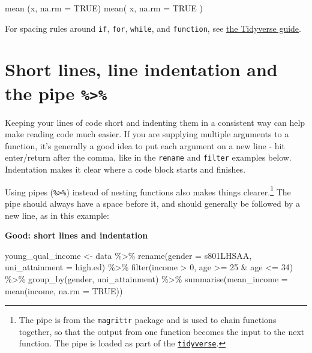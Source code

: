 \documentclass[
]{book}
\newenvironment{Shaded}{\begin{snugshade}}{\end{snugshade}}
\newcommand{\AttributeTok}[1]{\textcolor[rgb]{0.77,0.63,0.00}{#1}}
\newcommand{\ConstantTok}[1]{\textcolor[rgb]{0.00,0.00,0.00}{#1}}
\newcommand{\DecValTok}[1]{\textcolor[rgb]{0.00,0.00,0.81}{#1}}
\newcommand{\FunctionTok}[1]{\textcolor[rgb]{0.00,0.00,0.00}{#1}}
\newcommand{\NormalTok}[1]{#1}
\newcommand{\OtherTok}[1]{\textcolor[rgb]{0.56,0.35,0.01}{#1}}
\newcommand{\SpecialCharTok}[1]{\textcolor[rgb]{0.00,0.00,0.00}{#1}}
\begin{document}
\begin{Shaded}
\begin{Highlighting}[]
\FunctionTok{mean}\NormalTok{ (x, }\AttributeTok{na.rm =} \ConstantTok{TRUE}\NormalTok{)}
\FunctionTok{mean}\NormalTok{( x, }\AttributeTok{na.rm =} \ConstantTok{TRUE}\NormalTok{ )}
\end{Highlighting}
\end{Shaded}

For spacing rules around \texttt{if}, \texttt{for}, \texttt{while}, and \texttt{function}, see \href{https://style.tidyverse.org/syntax.html\#parentheses}{the Tidyverse guide}.

\hypertarget{short-lines-line-indentation-and-the-pipe}{%
\section{\texorpdfstring{Short lines, line indentation and the pipe \texttt{\%\textgreater{}\%}}{Short lines, line indentation and the pipe \%\textgreater\%}}\label{short-lines-line-indentation-and-the-pipe}}

Keeping your lines of code short and indenting them in a consistent way can help make reading code much easier. If you are supplying multiple arguments to a function, it's generally a good idea to put each argument on a new line - hit enter/return after the comma, like in the \texttt{rename} and \texttt{filter} examples below. Indentation makes it clear where a code block starts and finishes.

Using pipes (\texttt{\%\textgreater{}\%}) instead of nesting functions also makes things clearer.\footnote{The pipe is from the \texttt{magrittr} package and is used to chain functions together, so that the output from one function becomes the input to the next function. The pipe is loaded as part of the \protect\hyperlink{tidyverse}{\texttt{tidyverse}}.} The pipe should always have a space before it, and should generally be followed by a new line, as in this example:

\textbf{Good: short lines and indentation}

\begin{Shaded}
\begin{Highlighting}[]
\NormalTok{young\_qual\_income }\OtherTok{\textless{}{-}}\NormalTok{ data }\SpecialCharTok{\%\textgreater{}\%}
  \FunctionTok{rename}\NormalTok{(}\AttributeTok{gender =}\NormalTok{ s801LHSAA,}
         \AttributeTok{uni\_attainment =}\NormalTok{ high.ed) }\SpecialCharTok{\%\textgreater{}\%}
  \FunctionTok{filter}\NormalTok{(income }\SpecialCharTok{\textgreater{}} \DecValTok{0}\NormalTok{,}
\NormalTok{         age }\SpecialCharTok{\textgreater{}=} \DecValTok{25} \SpecialCharTok{\&}\NormalTok{ age }\SpecialCharTok{\textless{}=} \DecValTok{34}\NormalTok{) }\SpecialCharTok{\%\textgreater{}\%}
  \FunctionTok{group\_by}\NormalTok{(gender, }
\NormalTok{           uni\_attainment) }\SpecialCharTok{\%\textgreater{}\%}
  \FunctionTok{summarise}\NormalTok{(}\AttributeTok{mean\_income =} \FunctionTok{mean}\NormalTok{(income, }
                               \AttributeTok{na.rm =} \ConstantTok{TRUE}\NormalTok{))}
\end{Highlighting}
\end{Shaded}
\end{document}
